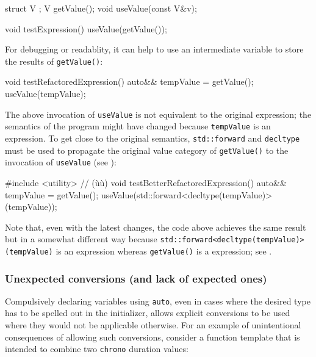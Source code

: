 \begin{emcppshiddenlisting}[emcppsbatch={e15,e15a,e16}]
struct V {};
V getValue();
void useValue(const V&v);
\end{emcppshiddenlisting}
\begin{emcppslisting}[emcppsbatch=e15]
void testExpression()
{
    useValue(getValue());
}
\end{emcppslisting}

For debugging or readablity, it can help to use an intermediate variable to
store the results of \lstinline!getValue()!:

\begin{emcppslisting}[emcppsbatch=e15a]
void testRefactoredExpression()
{
    auto&& tempValue = getValue();
    useValue(tempValue);
}
\end{emcppslisting}

\noindent The above invocation of \lstinline!useValue! is not equivalent to the
original expression; the semantics of the program might have changed because \lstinline!tempValue! is an  expression. To get
close to the original semantics, \lstinline!std::forward! and
\lstinline!decltype! must be used to propagate the original value category
of \lstinline!getValue()! to the invocation of \lstinline!useValue! (see
):

\begin{emcppslisting}[emcppsbatch=e16]
#include <utility>  // (ù{}ù)
void testBetterRefactoredExpression()
{
    auto&& tempValue = getValue();
    useValue(std::forward<decltype(tempValue)>(tempValue));
}
\end{emcppslisting}

\noindent Note that, even with the latest changes, the code above achieves the same result but in a somewhat different way because
 \lstinline!std::forward<decltype(tempValue)>(tempValue)! is
an  expression whereas \lstinline!getValue()! is a
 expression; see .

\subsubsection[Unexpected conversions (and lack of expected ones)]{Unexpected conversions (and lack of expected ones)}\label{unexpected-conversions-(and-lack-of-expected-ones)}

Compulsively declaring variables using \lstinline!auto!, even in cases
where the desired type has to be spelled out in the initializer, allows
explicit conversions to be used where they would not be applicable
otherwise. For an example of unintentional consequences of allowing such
conversions, consider a function template that is intended to combine
two \lstinline!chrono! duration values:

